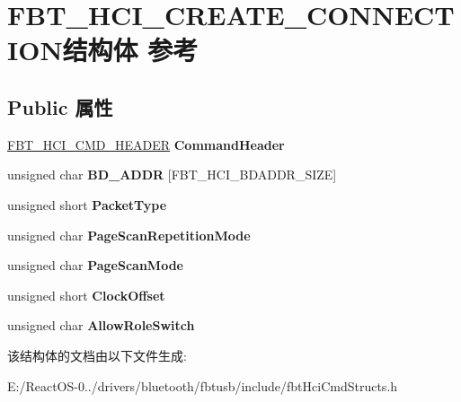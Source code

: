 \hypertarget{struct_f_b_t___h_c_i___c_r_e_a_t_e___c_o_n_n_e_c_t_i_o_n}{}\section{F\+B\+T\+\_\+\+H\+C\+I\+\_\+\+C\+R\+E\+A\+T\+E\+\_\+\+C\+O\+N\+N\+E\+C\+T\+I\+O\+N结构体 参考}
\label{struct_f_b_t___h_c_i___c_r_e_a_t_e___c_o_n_n_e_c_t_i_o_n}
\subsection*{Public 属性}
\begin{DoxyCompactItemize}
\item 
\mbox{\label{struct_f_b_t___h_c_i___c_r_e_a_t_e___c_o_n_n_e_c_t_i_o_n_abf34a847dc8ab3a33ae072ffe61e7f5b}} 
\hyperlink{struct_f_b_t___h_c_i___c_m_d___h_e_a_d_e_r}{F\+B\+T\+\_\+\+H\+C\+I\+\_\+\+C\+M\+D\+\_\+\+H\+E\+A\+D\+ER} {\bfseries Command\+Header}
\item 
\mbox{\label{struct_f_b_t___h_c_i___c_r_e_a_t_e___c_o_n_n_e_c_t_i_o_n_a243e246e02f75dcc0b64703031d4cea7}} 
unsigned char {\bfseries B\+D\+\_\+\+A\+D\+DR} \mbox{[}F\+B\+T\+\_\+\+H\+C\+I\+\_\+\+B\+D\+A\+D\+D\+R\+\_\+\+S\+I\+ZE\mbox{]}
\item 
\mbox{\label{struct_f_b_t___h_c_i___c_r_e_a_t_e___c_o_n_n_e_c_t_i_o_n_a8fac5520fa38f8fe9c148ba945ddd59a}} 
unsigned short {\bfseries Packet\+Type}
\item 
\mbox{\label{struct_f_b_t___h_c_i___c_r_e_a_t_e___c_o_n_n_e_c_t_i_o_n_a0b091754d19bbea80a7ed5ae6636f94f}} 
unsigned char {\bfseries Page\+Scan\+Repetition\+Mode}
\item 
\mbox{\label{struct_f_b_t___h_c_i___c_r_e_a_t_e___c_o_n_n_e_c_t_i_o_n_a0cc675d1000c0625df5e904bd6d99b86}} 
unsigned char {\bfseries Page\+Scan\+Mode}
\item 
\mbox{\label{struct_f_b_t___h_c_i___c_r_e_a_t_e___c_o_n_n_e_c_t_i_o_n_ae4c1960f51d78e5ec8f2194afa35184c}} 
unsigned short {\bfseries Clock\+Offset}
\item 
\mbox{\label{struct_f_b_t___h_c_i___c_r_e_a_t_e___c_o_n_n_e_c_t_i_o_n_acc292e7695372b88962131f0a3d05141}} 
unsigned char {\bfseries Allow\+Role\+Switch}
\end{DoxyCompactItemize}


该结构体的文档由以下文件生成\+:\begin{DoxyCompactItemize}
\item 
E\+:/\+React\+O\+S-\/0../drivers/bluetooth/fbtusb/include/fbt\+Hci\+Cmd\+Structs.\+h\end{DoxyCompactItemize}
